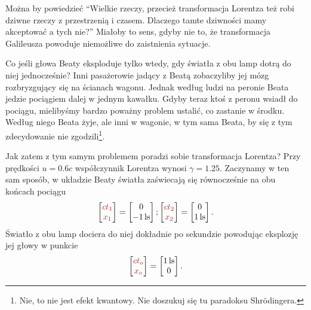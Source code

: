 \documentclass[10pt,twocolumn,fleqn,polish]{article}
\providecommand{\mathcolor}[2]{{\color{#1}#2}}
\newcommand{\mred}[1]{\mathcolor{BrickRed}{#1}}
\begin{document}
Można by powiedzieć ``Wielkie rzeczy, przecież transformacja Lorentza też robi dziwne
rzeczy z przestrzenią i czasem. Dlaczego tamte dziwności mamy akceptować a tych nie?''
Miałoby to sens, gdyby nie to, że transformacja Galileusza powoduje
niemożliwe do zaistnienia sytuacje.

Co jeśli głowa Beaty eksploduje tylko wtedy,
gdy światła z obu lamp dotrą do niej jednocześnie? Inni pasażerowie jadący
z Beatą zobaczyliby jej mózg rozbryzgujący się na ścianach wagonu. Jednak według
ludzi na peronie Beata jedzie pociągiem dalej w jednym kawałku.
Gdyby teraz ktoś z peronu wsiadł do pociągu, mielibyśmy bardzo poważny problem
ustalić, co zastanie w środku. Według niego Beata żyje, ale inni w wagonie,
w tym sama Beata, by się z tym zdecydowanie nie zgodzili\footnote{Nie, to nie jest
  efekt kwantowy. Nie doszukuj się tu paradoksu Shr\"odingera.}.

Jak zatem z tym samym problemem poradzi sobie transformacja Lorentza?
Przy prędkości $u = 0.6 c$ współczynnik Lorentza wynosi $\gamma = 1.25$.
Zaczynamy w ten sam sposób, w układzie Beaty światła zaświecają się równocześnie
na obu końcach pociągu
\[
  \begin{bmatrix}\mred{ct_1} \\ \mred{x_1}\end{bmatrix} =
  \begin{bmatrix} 0 \\ \SI{-1}{ls} \end{bmatrix};
  \begin{bmatrix}\mred{ct_2} \\ \mred{x_2}\end{bmatrix} =
  \begin{bmatrix} 0 \\ \SI{1}{ls} \end{bmatrix}.
\]
Światło z obu lamp dociera do niej dokładnie po sekundzie powodując eksplozję
jej głowy w punkcie
\[
  \begin{bmatrix}\mred{ct_o} \\ \mred{x_o}\end{bmatrix} =
  \begin{bmatrix}\SI{1}{ls} \\ 0 \end{bmatrix}.
\]
\end{document}
